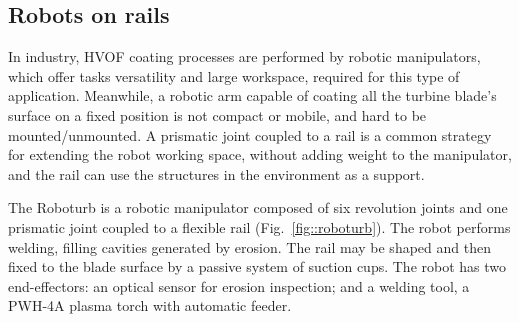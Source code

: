 \subsection{Robots on rails}\label{sec::rail}
In industry, HVOF coating processes are performed by robotic manipulators,
which offer tasks versatility and large workspace, required for this
type of application. Meanwhile, a robotic arm capable of coating all the turbine
blade's surface on a fixed position is not compact or mobile, and hard to be
mounted/unmounted. A prismatic joint coupled to a rail is a common strategy for
extending the robot working space, without adding weight to the manipulator,
and the rail can use the structures in the environment as a support.





The Roboturb \citep{roboturb} is a robotic manipulator composed of six
revolution joints and one prismatic joint coupled to a flexible rail
(Fig.~\ref{fig::roboturb}).
The robot performs welding, filling cavities generated by erosion. The rail
may be shaped and then fixed to the blade surface by a passive system of
suction cups. The robot has two end-effectors: an optical sensor for erosion
inspection; and a welding tool, a PWH-4A plasma torch with automatic feeder.

